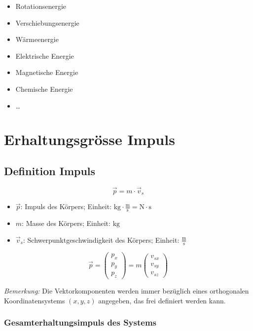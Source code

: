 \documentclass[a4paper, 8pt]{extarticle}
\begin{document}
\begin{landscape}
\begin{multicols*}{3}
\begin{itemize}
    \item Rotationsenergie
    \item Verschiebungsenergie
    \item Wärmeenergie
    \item Elektrische Energie
    \item Magnetische Energie
    \item Chemische Energie
    \item \dots
\end{itemize}

\section{Erhaltungsgrösse Impuls}
\subsection{ Definition Impuls}

\[
\vec{p} = m \cdot \vec{v}_s
\]

\begin{itemize}
    \item \( \vec{p} \): Impuls des Körpers; Einheit: \( \text{kg} \cdot \frac{\text{m}}{\text{s}} = \text{N} \cdot \text{s} \)
    \item \( m \): Masse des Körpers; Einheit: \( \text{kg} \)
    \item \( \vec{v}_s \): Schwerpunktgeschwindigkeit des Körpers; Einheit: \( \frac{\text{m}}{\text{s}} \)
\end{itemize}

\bigskip

\[
\vec{p} = \begin{pmatrix} p_x \\ p_y \\ p_z \end{pmatrix} = m \begin{pmatrix} v_{sx} \\ v_{sy} \\ v_{sz} \end{pmatrix}
\]

\textit{Bemerkung:} Die Vektorkomponenten werden immer bezüglich eines orthogonalen Koordinatensystems \( (x, y, z) \) angegeben, das frei definiert werden kann.

\subsubsection{ Gesamterhaltungsimpuls des Systems}


\end{multicols*}
\end{landscape}
\end{document}
